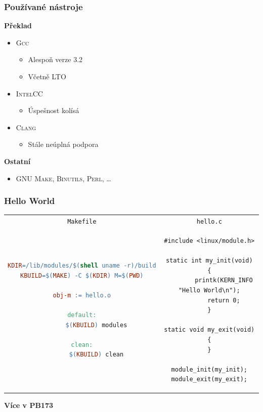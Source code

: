 \documentclass[xcolor=dvipsnames,handout]{beamer}
\newcommand{\heading}[1]{\textbf{\textcolor{BurntOrange}{#1}}}
\newcommand{\code}[2][]{\lstinline[columns=fullflexible, basicstyle=\ttfamily,
	#1]$#2$}
\newcommand{\file}[2][]{\code[language=XML, #1]{#2}}
\begin{document}
\begin{frame}
  \frametitle{Používané nástroje}

  \heading{Překlad}
  \begin{itemize}
    \item \textsc{Gcc}
    \begin{itemize}
      \item Alespoň verze 3.2
      \item Včetně LTO
    \end{itemize}

    \pause

    \item \textsc{IntelCC}
    \begin{itemize}
      \item Úspešnost kolísá
    \end{itemize}

    \item \textsc{Clang}
    \begin{itemize}
      \item Stále neúplná podpora
    \end{itemize}
  \end{itemize}

  \pause
  \medskip

  \heading{Ostatní}
  \begin{itemize}
    \item GNU \textsc{Make}, \textsc{Binutils}, \textsc{Perl}, \dots
  \end{itemize}

\end{frame}

\begin{frame}[fragile]
  \frametitle{Hello World}

  \begin{center}
  \begin{tabular}{c|c}
  \file{Makefile} & \file{hello.c} \\
  \begin{lstlisting}[language=make]
KDIR=/lib/modules/$(shell uname -r)/build
KBUILD=$(MAKE) -C $(KDIR) M=$(PWD)

obj-m := hello.o

default:
        $(KBUILD) modules

clean:
        $(KBUILD) clean
  \end{lstlisting} &

  \pause

  \begin{lstlisting}
#include <linux/module.h>

static int my_init(void)
{
       	printk(KERN_INFO "Hello World\n");
        return 0;
}

static void my_exit(void)
{
}

module_init(my_init);
module_exit(my_exit);
  \end{lstlisting}
  \end{tabular}

  \bigskip
  \bigskip
  \pause

  \heading{Více v PB173}
  \end{center}
\end{frame}
\end{document}
